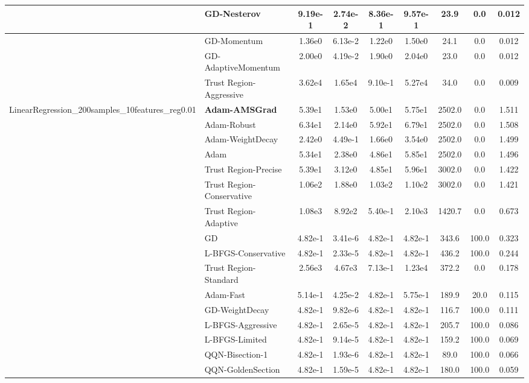 \documentclass{article}
\begin{document}
\begin{longtable}{|l|l|c|c|c|c|c|c|c|}
\hline
 & GD-Nesterov & 9.19e-1 & 2.74e-2 & 8.36e-1 & 9.57e-1 & 23.9 & 0.0 & 0.012 \\
\hline
 & GD-Momentum & 1.36e0 & 6.13e-2 & 1.22e0 & 1.50e0 & 24.1 & 0.0 & 0.012 \\
\hline
 & GD-AdaptiveMomentum & 2.00e0 & 4.19e-2 & 1.90e0 & 2.04e0 & 23.0 & 0.0 & 0.012 \\
\hline
 & Trust Region-Aggressive & 3.62e4 & 1.65e4 & 9.10e-1 & 5.27e4 & 34.0 & 0.0 & 0.009 \\
LinearRegression\_200samples\_10features\_reg0.01 & \textbf{Adam-AMSGrad} & 5.39e1 & 1.53e0 & 5.00e1 & 5.75e1 & 2502.0 & 0.0 & 1.511 \\
\hline
 & Adam-Robust & 6.34e1 & 2.14e0 & 5.92e1 & 6.79e1 & 2502.0 & 0.0 & 1.508 \\
\hline
 & Adam-WeightDecay & 2.42e0 & 4.49e-1 & 1.66e0 & 3.54e0 & 2502.0 & 0.0 & 1.499 \\
\hline
 & Adam & 5.34e1 & 2.38e0 & 4.86e1 & 5.85e1 & 2502.0 & 0.0 & 1.496 \\
\hline
 & Trust Region-Precise & 5.39e1 & 3.12e0 & 4.85e1 & 5.96e1 & 3002.0 & 0.0 & 1.422 \\
\hline
 & Trust Region-Conservative & 1.06e2 & 1.88e0 & 1.03e2 & 1.10e2 & 3002.0 & 0.0 & 1.421 \\
\hline
 & Trust Region-Adaptive & 1.08e3 & 8.92e2 & 5.40e-1 & 2.10e3 & 1420.7 & 0.0 & 0.673 \\
\hline
 & GD & 4.82e-1 & 3.41e-6 & 4.82e-1 & 4.82e-1 & 343.6 & 100.0 & 0.323 \\
\hline
 & L-BFGS-Conservative & 4.82e-1 & 2.33e-5 & 4.82e-1 & 4.82e-1 & 436.2 & 100.0 & 0.244 \\
\hline
 & Trust Region-Standard & 2.56e3 & 4.67e3 & 7.13e-1 & 1.23e4 & 372.2 & 0.0 & 0.178 \\
\hline
 & Adam-Fast & 5.14e-1 & 4.25e-2 & 4.82e-1 & 5.75e-1 & 189.9 & 20.0 & 0.115 \\
\hline
 & GD-WeightDecay & 4.82e-1 & 9.82e-6 & 4.82e-1 & 4.82e-1 & 116.7 & 100.0 & 0.111 \\
\hline
 & L-BFGS-Aggressive & 4.82e-1 & 2.65e-5 & 4.82e-1 & 4.82e-1 & 205.7 & 100.0 & 0.086 \\
\hline
 & L-BFGS-Limited & 4.82e-1 & 9.14e-5 & 4.82e-1 & 4.82e-1 & 159.2 & 100.0 & 0.069 \\
\hline
 & QQN-Bisection-1 & 4.82e-1 & 1.93e-6 & 4.82e-1 & 4.82e-1 & 89.0 & 100.0 & 0.066 \\
\hline
 & QQN-GoldenSection & 4.82e-1 & 1.59e-5 & 4.82e-1 & 4.82e-1 & 180.0 & 100.0 & 0.059 \\

\end{longtable}
\end{document}
